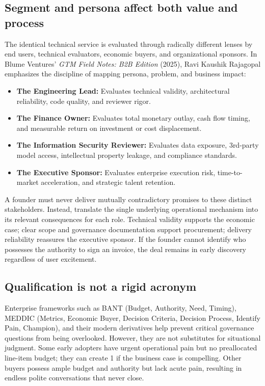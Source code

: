 \subsection{Segment and persona affect both value and process}

The identical technical service is evaluated through radically different lenses by end users, technical evaluators, economic buyers, and organizational sponsors. In Blume Ventures' \textit{GTM Field Notes: B2B Edition} (2025), Ravi Kaushik Rajagopal emphasizes the discipline of mapping persona, problem, and business impact:
\begin{itemize}
\item \textbf{The Engineering Lead:} Evaluates technical validity, architectural reliability, code quality, and reviewer rigor.
\item \textbf{The Finance Owner:} Evaluates total monetary outlay, cash flow timing, and measurable return on investment or cost displacement.
\item \textbf{The Information Security Reviewer:} Evaluates data exposure, 3rd-party model access, intellectual property leakage, and compliance standards.
\item \textbf{The Executive Sponsor:} Evaluates enterprise execution risk, time-to-market acceleration, and strategic talent retention.
\end{itemize}
A founder must never deliver mutually contradictory promises to these distinct stakeholders. Instead, translate the single underlying operational mechanism into its relevant consequences for each role. Technical validity supports the economic case; clear scope and governance documentation support procurement; delivery reliability reassures the executive sponsor. If the founder cannot identify who possesses the authority to sign an invoice, the deal remains in early discovery regardless of user excitement.

\subsection{Qualification is not a rigid acronym}

Enterprise frameworks such as BANT (Budget, Authority, Need, Timing), MEDDIC (Metrics, Economic Buyer, Decision Criteria, Decision Process, Identify Pain, Champion), and their modern derivatives help prevent critical governance questions from being overlooked. However, they are not substitutes for situational judgment. Some early adopters have urgent operational pain but no preallocated line-item budget; they can create 1 if the business case is compelling. Other buyers possess ample budget and authority but lack acute pain, resulting in endless polite conversations that never close.

